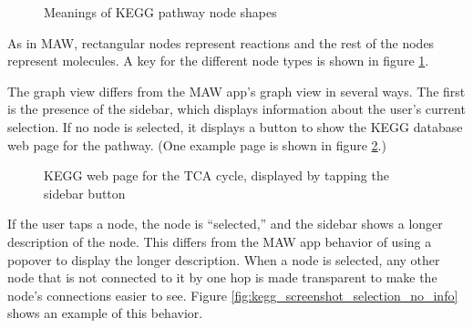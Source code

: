 \begin{figure}[hbt]
    \caption{\label{fig:kegg_node_legend} Meanings of KEGG pathway node shapes}
\end{figure}

As in MAW, rectangular nodes represent reactions and the rest of the nodes
represent molecules. A key for the different node types is shown in figure
\ref{fig:kegg_node_legend}.

The graph view differs from the MAW app's graph view in several ways. The first
is the presence of the sidebar, which displays information about the user's
current selection. If no node is selected, it displays a button to show the KEGG
database web page for the pathway. (One example page is shown in figure
\ref{fig:kegg_screenshot_kegg_web_site}.)

\begin{figure}[hbt]
    \caption{\label{fig:kegg_screenshot_kegg_web_site} KEGG web page for the TCA
    cycle, displayed by tapping the sidebar button}
\end{figure}

If the user taps a node, the node is ``selected,'' and the sidebar shows a
longer description of the node.  This differs from the MAW app behavior of using
a popover to display the longer description. When a node is selected, any other
node that is not connected to it by one hop is made transparent to make the
node's connections easier to see.  Figure
\ref{fig:kegg_screenshot_selection_no_info} shows an example of this behavior.

